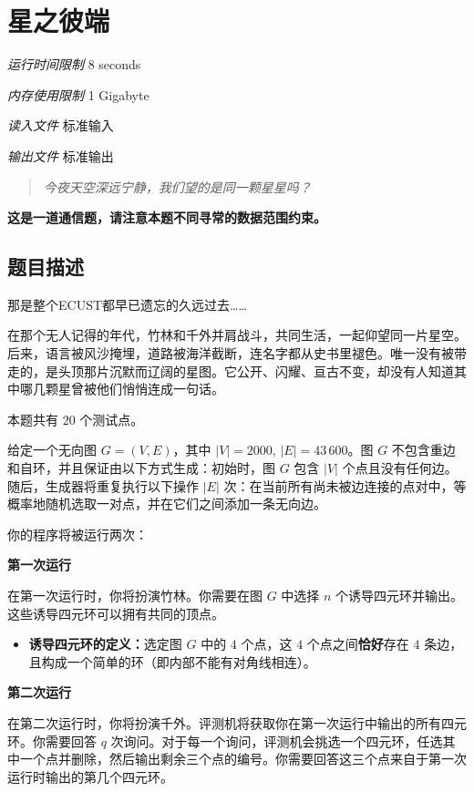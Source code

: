 \section[G. 星之彼端]{ 星之彼端}

\textit{运行时间限制}   8 seconds

\textit{内存使用限制} 1 Gigabyte

\textit{读入文件} \qquad 标准输入

\textit{输出文件} \qquad 标准输出


\begin{quote}
	\textit{今夜天空深远宁静，我们望的是同一颗星星吗？}
\end{quote}

\textbf{这是一道通信题，请注意本题不同寻常的数据范围约束。}

\subsection{题目描述}

那是整个ECUST都早已遗忘的久远过去……

在那个无人记得的年代，竹林和千外并肩战斗，共同生活，一起仰望同一片星空。后来，语言被风沙掩埋，道路被海洋截断，连名字都从史书里褪色。唯一没有被带走的，是头顶那片沉默而辽阔的星图。它公开、闪耀、亘古不变，却没有人知道其中哪几颗星曾被他们悄悄连成一句话。

本题共有 $20$ 个测试点。

给定一个无向图 $G = (V, E)$，其中 $|V| = 2000$, $|E| = 43\,600$。图 $G$ 不包含重边和自环，并且保证由以下方式生成：初始时，图 $G$ 包含 $|V|$ 个点且没有任何边。随后，生成器将重复执行以下操作 $|E|$ 次：在当前所有尚未被边连接的点对中，等概率地随机选取一对点，并在它们之间添加一条无向边。

你的程序将被运行两次：

\textbf{第一次运行}

在第一次运行时，你将扮演竹林。你需要在图 $G$ 中选择 $n$ 个诱导四元环并输出。这些诱导四元环可以拥有共同的顶点。

\begin{itemize}
	\item \textbf{诱导四元环的定义：}选定图 $G$ 中的 $4$ 个点，这 $4$ 个点之间\textbf{恰好}存在 $4$ 条边，且构成一个简单的环（即内部不能有对角线相连）。
\end{itemize}

\textbf{第二次运行}

在第二次运行时，你将扮演千外。评测机将获取你在第一次运行中输出的所有四元环。你需要回答 $q$ 次询问。对于每一个询问，评测机会挑选一个四元环，任选其中一个点并删除，然后输出剩余三个点的编号。你需要回答这三个点来自于第一次运行时输出的第几个四元环。

